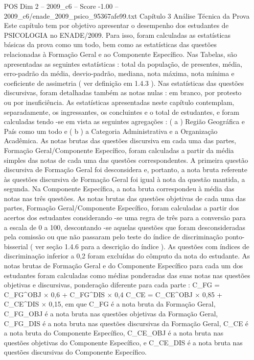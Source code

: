 \begin{textsample}{POS Dim 2 – 2009\_c6 – Score -1.00 – 2009\_c6/enade\_2009\_psico\_95367afe99.txt}  \label{ex:f2_pos_297}
Capítulo 3 Análise Técnica da Prova Este capítulo tem por objetivo apresentar o desempenho dos estudantes de PSICOLOGIA no ENADE/2009.
Para isso, foram calculadas as estatísticas básicas da prova como um todo, bem como as estatísticas das questões relacionadas à Formação Geral e ao Componente Específico.
Nas Tabelas, são apresentadas as seguintes estatísticas : total da população, de presentes, média, erro-padrão da média, desvio-padrão, mediana, nota máxima, nota mínima e coeficiente de assimetria ( ver definição em 1.4.3 ).
Nas estatísticas das questões discursivas, foram detalhadas também as notas nulas : em branco, por protesto ou por insuficiência.
As estatísticas apresentadas neste capítulo contemplam, separadamente, os ingressantes, os concluintes e o total de estudantes, e foram calculadas tendo -se em vista as seguintes agregações : ( a ) Região Geográfica e País como um todo e ( b ) a Categoria Administrativa e a Organização Acadêmica.
As notas brutas das questões discursiva em cada uma das partes, Formação Geral/Componente Específico, foram calculadas a partir da média simples das notas de cada uma das questões correspondentes.
A primeira questão discursiva de Formação Geral foi desconsidera e, portanto, a nota bruta referente às questões discursiva de Formação Geral foi igual à nota da questão mantida, a segunda.
Na Componente Específica, a nota bruta correspondeu à média das notas nas três questões.
As notas brutas das questões objetivas de cada uma das partes, Formação Geral/Componente Específico, foram calculadas a partir dos acertos dos estudantes considerando -se uma regra de três para a conversão para a escala de 0 a 100, descontando -se aquelas questões que foram desconsideradas pela comissão ou que não passaram pelo teste do índice de discriminação ponto-bisserial ( ver seção 1.4.6 para a descrição do índice ).
As questões com índices de discriminação inferior a 0,2 foram excluídas do cômputo da nota do estudante.
As notas brutas de Formação Geral e do Componente Específico para cada um dos estudantes foram calculadas como médias ponderadas das suas notas nas questões objetivas e discursivas, ponderação diferente para cada parte : C\_FG = C\_FG\textasciicircum{}OBJ × 0,6 + C\_FG\textasciicircum{}DIS × 0,4 C\_CE = C\_CE\textasciicircum{}OBJ × 0,85 + C\_CE\textasciicircum{}DIS × 0,15, em que C\_FG é a nota bruta da Formação Geral, C\_FG\_OBJ é a nota bruta nas questões objetivas da Formação Geral, C\_FG\_DIS é a nota bruta nas questões discursivas da Formação Geral, C\_CE é a nota bruta do Componente Específico, C\_CE\_OBJ é a nota bruta nas questões objetivas do Componente Específico, e C\_CE\_DIS é a nota bruta nas questões discursivas do Componente Específico.

\end{textsample}
